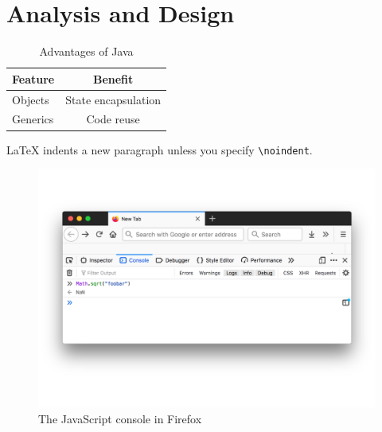 \chapter{Analysis and Design}
\label{chap:analysis-and-design}

\bigskip

\begin{table}[tb] %
  \centering
  \begin{tabular}{l c}  %
    Feature  & Benefit
    \\\hline
    Objects  & State encapsulation
    \\
    Generics & Code reuse
  \end{tabular}
  \caption{Advantages of Java}
  \label{tab:java-advantages}
\end{table}

\bigskip

\noindent
LaTeX indents a new paragraph unless you specify \lstinline{\noindent}.

\bigskip


\begin{figure}[tb] %
  \centering
  \includegraphics[width=.9\linewidth]{assets/firefox-js-console}
  \caption{The JavaScript console in Firefox }
  \label{fig:firefox-js-console}
\end{figure}
